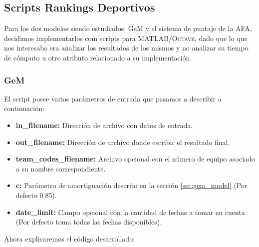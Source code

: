 \subsection{Scripts Rankings Deportivos}

Para los dos modelos siendo estudiados, GeM y el sistema de puntaje de la AFA,
decidimos implementarlos com scripts para \textsc{MATLAB/Octave}, dado que lo que nos
interesaba era analizar los resultados de los mismos y no analizar su tiempo de
cómputo u otro atributo relacionado a su implementación.

\subsubsection{GeM}

El script posee varios parámetros de entrada que pasamos a describir a
continuación:

\begin{itemize}
	\item \textbf{in_filename:} Dirección de archivo con datos de entrada.
	\item \textbf{out_filename:} Dirección de archivo donde escribir el
	resultado final.
	\item \textbf{team_codes_filename:} Archivo opcional con el número de equipo
	asociado a su nombre correspondiente.
	\item \textbf{c:} Parámetro de amortiguación descrito en la
	sección \ref{sec:gem_model} (Por defecto 0.85).
	\item \textbf{date_limit:} Campo opcional con la cantidad de fechas a tomar
	en cuenta (Por defecto toma todas las fechas disponibles).
\end{itemize}

Ahora explicaremos el código desarrollado:


